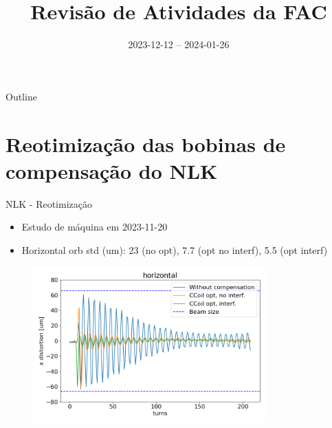 \documentclass{beamer}					  %
\title{Revisão de Atividades da FAC}	%
\institute{LNLS.DAC.FAC}				%
\date{2023-12-12 -- 2024-01-26}			%
\begin{document}
\begin{frame}
  \titlepage
  \href{https://github.com/lnls-fac/doc-review-dac-fac}{}
  \href{https://www.overleaf.com/read/sbdjxtzfchrm}{}
\end{frame}

\begin{frame}{Outline}
  \tableofcontents
\end{frame}


\section{Reotimização das bobinas de compensação do NLK}

\begin{frame}{NLK - Reotimização}
    \scriptsize{\begin{itemize}
    		\item Estudo de máquina em 2023-11-20
            \item Horizontal orb std (um): 23 (no opt), 7.7 (opt no interf),  5.5 (opt interf)
    \end{itemize}}
    \begin{figure}[H]
        	\centering
            \includegraphics[width=0.8\textwidth]{2023-12-12/figures/horizontal_nlk_distortion_interference.png}
            \label{fig:bba}
    \end{figure} 
\end{frame}
\end{document}
